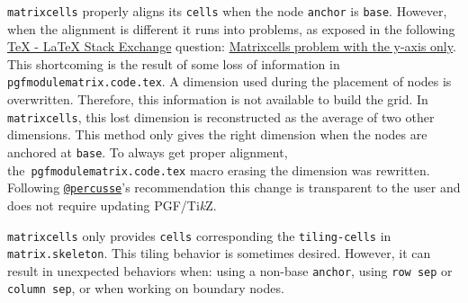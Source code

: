 \documentclass{scrartcl}
\newcommand\code\texttt
\newcommand{\TikZ}{Ti\textit{k}Z\xspace}
\begin{document}
\code{matrixcells} properly aligns its \code{cells} when the node \code{anchor} is \code{base}.
However, when the alignment is different it runs into problems, as exposed in the following \href{http://tex.stackexchange.com}{\TeX{} - \LaTeX{} Stack Exchange} question: \href{http://tex.stackexchange.com/questions/128045/matrixcells-problem-with-the-y-axis-only}{Matrixcells problem with the y-axis only}.
This shortcoming is the result of some loss of information in \code{pgfmodulematrix.code.tex}.
A dimension used during the placement of nodes is overwritten.
Therefore, this information is not available to build the grid.
In \code{matrixcells}, this lost dimension is reconstructed as the average of two other dimensions.
This method only gives the right dimension when the nodes are anchored at \code{base}.
To always get proper alignment, the~\code{pgfmodulematrix.code.tex} macro erasing the dimension was rewritten.
Following \href{http://tex.stackexchange.com/users/3235/percusse}{\code{@percusse}}'s recommendation this change is transparent to the user and does not require updating PGF/\TikZ.

\code{matrixcells} only provides \code{cells} corresponding the \code{tiling-cells} in \code{matrix.skeleton}.
This tiling behavior is sometimes desired.
However, it can result in unexpected behaviors when: using a non-base \code{anchor}, using \code{row sep} or \code{column sep}, or when working on boundary nodes.
\end{document}
